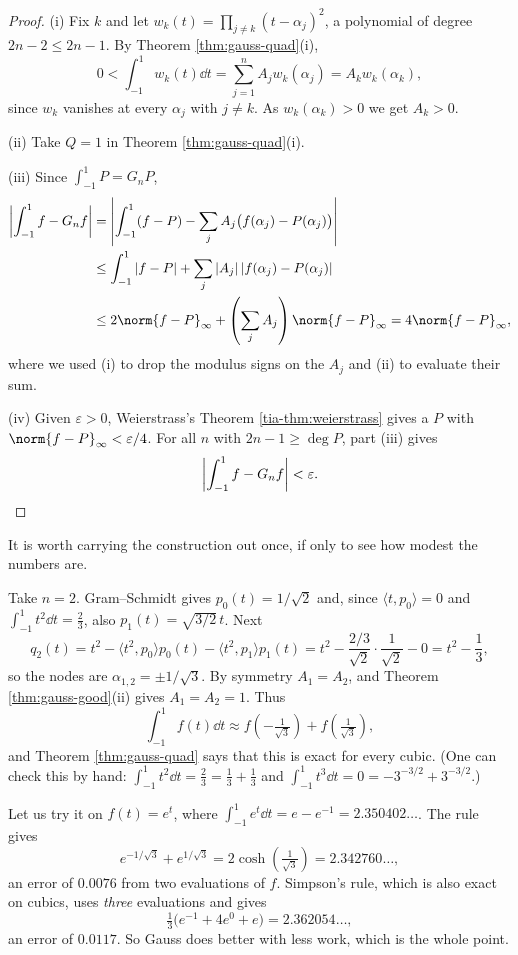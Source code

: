 \documentclass[a4paper]{scrartcl}
\begin{document}
\begin{proof}
	(i) Fix $k$ and let $w_k(t) = \prod_{j\neq k}(t-\alpha_j)^2$, a polynomial of degree $2n-2 \leq 2n-1$. By Theorem \ref{thm:gauss-quad}(i),
	$$0 < \int_{-1}^1 w_k(t)\dd t = \sum_{j=1}^n A_jw_k(\alpha_j) = A_kw_k(\alpha_k),$$
	since $w_k$ vanishes at every $\alpha_j$ with $j \neq k$. As $w_k(\alpha_k)>0$ we get $A_k>0$.

	(ii) Take $Q = 1$ in Theorem \ref{thm:gauss-quad}(i).

	(iii) Since $\int_{-1}^1 P = G_nP$,
	\begin{align*}
		\left|\int_{-1}^1 f - G_nf\right| &= \left|\int_{-1}^1(f-P) - \sum_j A_j\big(f(\alpha_j)-P(\alpha_j)\big)\right|\\
		&\leq \int_{-1}^1|f-P| + \sum_j |A_j|\,|f(\alpha_j)-P(\alpha_j)|\\
		&\leq 2\norm{f-P}_\infty + \left(\sum_j A_j\right)\norm{f-P}_\infty = 4\norm{f-P}_\infty,
	\end{align*}
	where we used (i) to drop the modulus signs on the $A_j$ and (ii) to evaluate their sum.

	(iv) Given $\varepsilon>0$, Weierstrass's Theorem \ref{tia-thm:weierstrass} gives a $P$ with $\norm{f-P}_\infty<\varepsilon/4$. For all $n$ with $2n-1\geq\deg P$, part (iii) gives
	$$\left|\int_{-1}^1f - G_nf\right| < \varepsilon. \qedhere$$
\end{proof}

It is worth carrying the construction out once, if only to see how modest the numbers are.

\begin{example}
	Take $n = 2$. Gram--Schmidt gives $p_0(t) = 1/\sqrt2$ and, since $\langle t,p_0\rangle = 0$ and $\int_{-1}^1t^2\dd t = \tfrac23$, also $p_1(t) = \sqrt{3/2}\,t$. Next
	$$q_2(t) = t^2 - \langle t^2,p_0\rangle p_0(t)-\langle t^2,p_1\rangle p_1(t) = t^2 - \frac{2/3}{\sqrt2}\cdot\frac{1}{\sqrt2} - 0 = t^2-\frac13,$$
	so the nodes are $\alpha_{1,2} = \pm 1/\sqrt3$. By symmetry $A_1 = A_2$, and Theorem \ref{thm:gauss-good}(ii) gives $A_1=A_2=1$. Thus
	$$\int_{-1}^1 f(t)\dd t \approx f\!\left(-\tfrac{1}{\sqrt3}\right)+f\!\left(\tfrac1{\sqrt3}\right),$$
	and Theorem \ref{thm:gauss-quad} says that this is exact for every cubic. (One can check this by hand: $\int_{-1}^1t^2\dd t = \tfrac23 = \tfrac13+\tfrac13$ and $\int_{-1}^1t^3\dd t = 0 = -3^{-3/2}+3^{-3/2}$.)

	Let us try it on $f(t)=e^t$, where $\int_{-1}^1e^t\dd t = e - e^{-1} = 2.350402\ldots$. The rule gives
	$$e^{-1/\sqrt3}+e^{1/\sqrt3} = 2\cosh\!\left(\tfrac{1}{\sqrt3}\right) = 2.342760\ldots,$$
	an error of $0.0076$ from two evaluations of $f$. Simpson's rule, which is also exact on cubics, uses \emph{three} evaluations and gives
	$$\tfrac13\big(e^{-1}+4e^0+e\big) = 2.362054\ldots,$$
	an error of $0.0117$. So Gauss does better with less work, which is the whole point.
\end{example}
\end{document}
